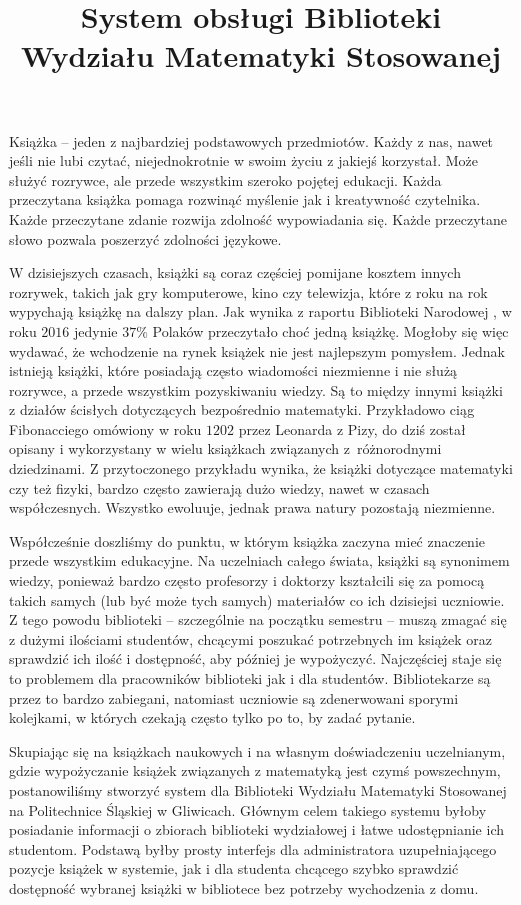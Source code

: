 \documentclass[twoside]{projektInzynierskiMS}
\title{System obsługi Biblioteki Wydziału Matematyki Stosowanej}
\begin{document}
Książka -- jeden z najbardziej podstawowych przedmiotów. Każdy z nas, nawet jeśli nie lubi czytać, niejednokrotnie w swoim życiu z jakiejś korzystał. Może służyć rozrywce, ale przede wszystkim szeroko pojętej edukacji. Każda przeczytana książka pomaga rozwinąć myślenie jak i kreatywność czytelnika. Każde przeczytane zdanie rozwija zdolność wypowiadania się. 
Każde przeczytane słowo pozwala poszerzyć zdolności językowe.

W dzisiejszych czasach, książki są coraz częściej pomijane kosztem innych rozrywek, takich jak gry komputerowe, kino czy telewizja, które z roku na rok wypychają książkę na dalszy plan. Jak wynika z raportu Biblioteki Narodowej \cite{raportBN}, w roku $2016$ jedynie $37\%$ Polaków przeczytało choć jedną książkę. Mogłoby się więc wydawać, że wchodzenie na rynek książek nie jest najlepszym pomysłem. Jednak istnieją książki, które posiadają często wiadomości niezmienne i nie służą rozrywce, a przede wszystkim pozyskiwaniu wiedzy. Są to między innymi książki z działów ścisłych dotyczących bezpośrednio matematyki. Przykładowo ciąg Fibonacciego omówiony w roku $1202$ przez Leonarda z Pizy, do dziś został opisany i wykorzystany w wielu książkach związanych z~różnorodnymi dziedzinami. Z przytoczonego przykładu wynika, że książki dotyczące matematyki czy też fizyki, bardzo często zawierają dużo wiedzy, nawet w czasach współczesnych. Wszystko ewoluuje, jednak prawa natury pozostają niezmienne.

Współcześnie doszliśmy do punktu, w którym książka zaczyna mieć znaczenie przede wszystkim edukacyjne. Na uczelniach całego świata, książki są synonimem wiedzy, ponieważ bardzo często profesorzy i doktorzy kształcili się za pomocą takich samych (lub być może tych samych) materiałów co ich dzisiejsi uczniowie. Z tego powodu biblioteki -- szczególnie na początku semestru -- muszą zmagać się z dużymi ilościami studentów, chcącymi poszukać potrzebnych im książek oraz sprawdzić ich ilość i dostępność, aby później je wypożyczyć. Najczęściej staje się to problemem dla pracowników biblioteki jak i dla studentów. Bibliotekarze są przez to bardzo zabiegani, natomiast uczniowie są zdenerwowani sporymi kolejkami, w których czekają często tylko po to, by zadać pytanie.

Skupiając się na książkach naukowych i na własnym doświadczeniu uczelnianym, gdzie wypożyczanie książek związanych z matematyką jest czymś powszechnym, postanowiliśmy stworzyć system dla Biblioteki Wydziału Matematyki Stosowanej na Politechnice Śląskiej w Gliwicach. Głównym celem takiego systemu byłoby posiadanie informacji o zbiorach biblioteki wydziałowej i łatwe udostępnianie ich studentom. Podstawą byłby prosty interfejs dla administratora uzupełniającego pozycje książek w systemie, jak i dla studenta chcącego szybko sprawdzić dostępność wybranej książki w bibliotece bez potrzeby wychodzenia z domu.
\end{document}
